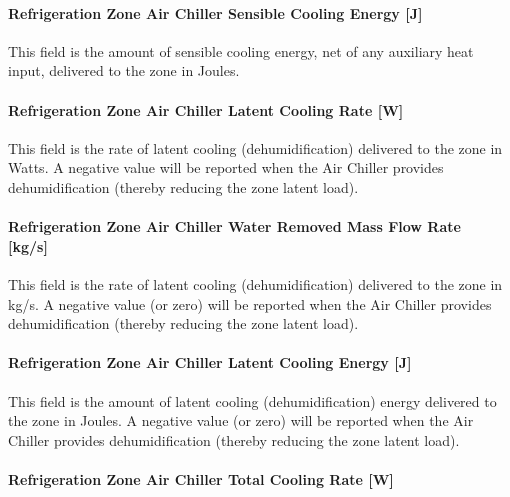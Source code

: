 \paragraph{Refrigeration Zone Air Chiller Sensible Cooling Energy {[}J{]}}\label{refrigeration-zone-air-chiller-sensible-cooling-energy-j-1}

This field is the amount of sensible cooling energy, net of any auxiliary heat input, delivered to the zone in Joules.

\paragraph{Refrigeration Zone Air Chiller Latent Cooling Rate {[}W{]}}\label{refrigeration-zone-air-chiller-latent-cooling-rate-w-2}

This field is the rate of latent cooling (dehumidification) delivered to the zone in Watts. A negative value will be reported when the Air Chiller provides dehumidification (thereby reducing the zone latent load).

\paragraph{Refrigeration Zone Air Chiller Water Removed Mass Flow Rate~ {[}kg/s{]}}\label{refrigeration-zone-air-chiller-water-removed-mass-flow-rate-kgs-2}

This field is the rate of latent cooling (dehumidification) delivered to the zone in kg/s. A negative value (or zero) will be reported when the Air Chiller provides dehumidification (thereby reducing the zone latent load).

\paragraph{Refrigeration Zone Air Chiller Latent Cooling Energy {[}J{]}}\label{refrigeration-zone-air-chiller-latent-cooling-energy-j-1}

This field is the amount of latent cooling (dehumidification) energy delivered to the zone in Joules. A negative value (or zero) will be reported when the Air Chiller provides dehumidification (thereby reducing the zone latent load).

\paragraph{Refrigeration Zone Air Chiller Total Cooling Rate {[}W{]}}\label{refrigeration-zone-air-chiller-total-cooling-rate-w-2}

